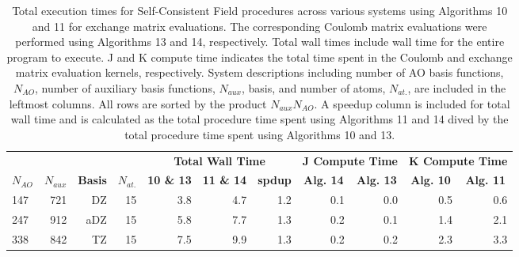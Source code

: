 \begingroup
\renewcommand{\arraystretch}{0.7}
\begin{table}[H]
\footnotesize
\centering
\renewcommand{\baselinestretch}{1}
\caption{Total execution times for Self-Consistent Field procedures across various systems using Algorithms 10 and 11 for exchange matrix evaluations. 
The corresponding Coulomb matrix evaluations were performed using Algorithms 13 and 14, respectively. Total wall times include 
wall time for the entire program to execute. J and K compute time indicates the total time spent in the Coulomb and exchange matrix
evaluation kernels, respectively. System descriptions including number of AO basis functions, $N_{AO}$, number of auxiliary basis functions,
$N_{aux}$, basis, and number of atoms, $N_{at.}$, are included in the leftmost columns. All rows are sorted by the product $N_{aux}N_{AO}$.
A speedup column is included for total wall time and is calculated as the total procedure time spent using Algorithms 11 and 14 dived by 
the total procedure time spent using Algorithms 10 and 13.
\label{tbl:practical_speedups}}
\begin{tabular}{lrrrrrrrrrr}
  \multicolumn{1}{c}{\textbf{}} 
& \multicolumn{1}{c}{\textbf{}} 
& \multicolumn{1}{c}{\textbf{}} 
& \multicolumn{1}{c}{\textbf{}} 
& \multicolumn{3}{c}{\textbf{Total Wall Time}}  
& \multicolumn{2}{c}{\textbf{J Compute Time}}  
& \multicolumn{2}{c}{\textbf{K Compute Time}} \\ 
\cline{5-7}
\cline{8-9}
\cline{10-11}
  \multicolumn{1}{c}{\textbf{$N_{AO}$}} 
& \multicolumn{1}{c}{\textbf{$N_{aux}$}} 
& \multicolumn{1}{c}{\textbf{Basis}} 
& \multicolumn{1}{c}{\textbf{$N_{at.}$}} 
& \multicolumn{1}{c}{\textbf{10 \& 13}} 
& \multicolumn{1}{c}{\textbf{11 \& 14}} 
& \multicolumn{1}{c}{\textbf{spdup}} 
& \multicolumn{1}{c}{\textbf{Alg. 14}} 
& \multicolumn{1}{c}{\textbf{Alg. 13}} 
& \multicolumn{1}{c}{\textbf{Alg. 10}} 
& \multicolumn{1}{c}{\textbf{Alg. 11}} \\ 
\hline
 147&  721&    DZ&    15&                 3.8 &                4.7&     1.2 &                0.1 &                0.0&                 0.5&                 0.6\\
 247&  912&   aDZ&    15&                 5.8 &                7.7&     1.3 &                0.2 &                0.1&                 1.4&                 2.1\\
 338&  842&    TZ&    15&                 7.5 &                9.9&     1.3 &                0.2 &                0.2&                 2.3&                 3.3\\

\end{tabular}
\end{table}
